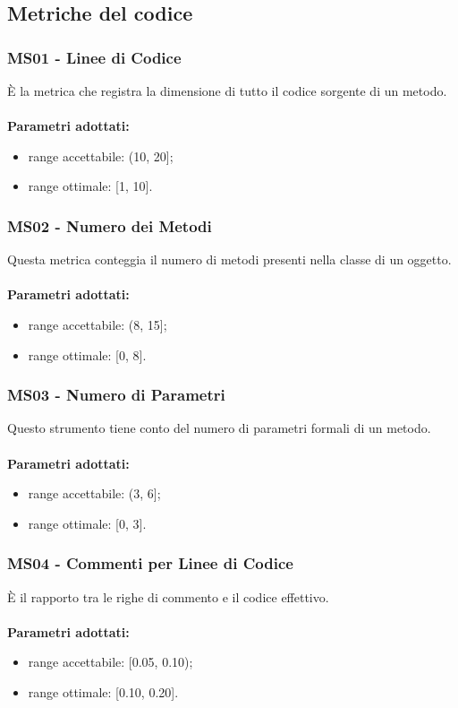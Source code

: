 \subsection{Metriche del codice}
\subsubsection{MS01 - Linee di Codice}
È la metrica che registra la dimensione di tutto il codice sorgente di un metodo.\\ \\
\textbf{Parametri adottati:}
\begin{itemize}
\item range accettabile: (10, 20];
\item range ottimale: [1, 10].
\end{itemize}
\subsubsection{MS02 - Numero dei Metodi}
Questa metrica conteggia il numero di metodi presenti nella classe di un oggetto.\\ \\ 
\textbf{Parametri adottati:} 
\begin{itemize}
\item range accettabile: (8, 15];
\item range ottimale: [0, 8].
\end{itemize}
\subsubsection{MS03 - Numero di Parametri}
Questo strumento tiene conto del numero di parametri formali di un metodo.\\ \\ 
\textbf{Parametri adottati:} 
\begin{itemize}
\item range accettabile: (3, 6];
\item range ottimale: [0, 3].
\end{itemize}
\subsubsection{MS04 - Commenti per Linee di Codice}
È il rapporto tra le righe di commento e il codice effettivo.\\ \\ 
\textbf{Parametri adottati:} 
\begin{itemize}
\item range accettabile: [0.05, 0.10);
\item range ottimale: [0.10, 0.20].
\end{itemize}
